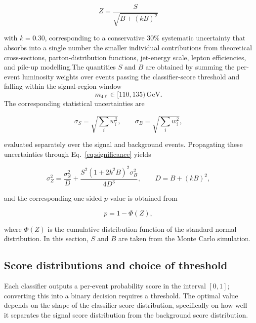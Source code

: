 \documentclass[conference]{IEEEtran}
\begin{document}
{\begin{equation}
Z =
\frac{S}{\sqrt{B + (kB)^2}}
\label{eq:significance}
\end{equation}

with $k = 0.30$, corresponding to a conservative 30\% systematic uncertainty that absorbs into a single number the smaller individual contributions from theoretical cross-sections, parton-distribution functions, jet-energy scale, lepton efficiencies, and pile-up modelling.The quantities $S$ and $B$ are obtained by summing the per-event luminosity weights over events passing the classifier-score threshold and falling within the signal-region window 
\[
m_{4\ell} \in [110,135)\,\mathrm{GeV}.
\]
The corresponding statistical uncertainties are

\begin{equation}
\sigma_S = \sqrt{\sum_i w_i^2},
\qquad
\sigma_B = \sqrt{\sum_i w_i^2},
\label{eq:yield_uncertainties}
\end{equation}

evaluated separately over the signal and background events\cite{atlas2018higgsmass}. Propagating these uncertainties through Eq.~\ref{eq:significance} yields

\begin{equation}
\sigma_Z^2 =
\frac{\sigma_S^2}{D}
+
\frac{
S^2 (1 + 2k^2B)^2 \sigma_B^2
}{
4D^3
},
\qquad
D = B + (kB)^2,
\label{eq:significance_uncertainty}
\end{equation}

and the corresponding one-sided $p$-value is obtained from

\begin{equation}
p = 1 - \Phi(Z),
\label{eq:pvalue}
\end{equation}

where $\Phi(Z)$ is the cumulative distribution function of the standard normal distribution. In this section, $S$ and $B$ are taken from the Monte Carlo simulation.


\subsection{Score distributions and choice of threshold}
Each classifier outputs a per-event probability score in the interval $[0,1]$; converting this into a binary decision requires a threshold. The optimal value depends on the shape of the classifier score distribution, specifically on how well it separates the signal score distribution from the background score distribution.

}
\end{document}
